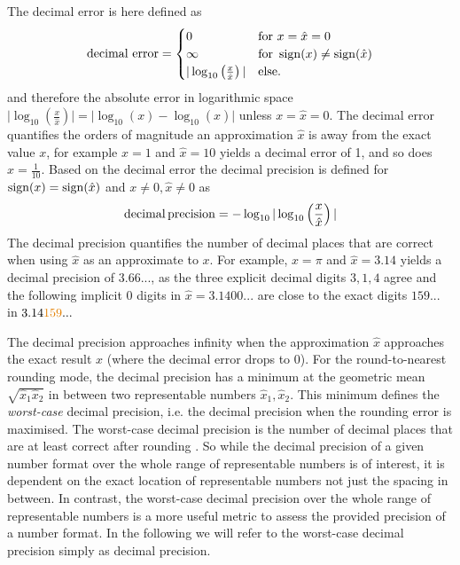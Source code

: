 The decimal error is here defined as
\begin{equation}
	\text{decimal error} = \begin{cases}
						0 &\text{for } x = \hat{x} = 0 \\
						\infty &\text{for } \operatorname{sign}(x) \neq \operatorname{sign}(\hat{x}) \\
						\vert \log_{10}\left( \frac{x}{\hat{x}} \right) \vert &\text{else.}
					\end{cases}
	\label{eq:decerror}
\end{equation}
and therefore the absolute error in logarithmic space
$\vert \log_{10}(\tfrac{x}{\hat{x}}) \vert = \vert \log_{10}(x) - \log_{10}(\hat{x}) \vert$ unless $x = \hat{x} = 0$.
The decimal error quantifies the orders of magnitude an approximation $\hat{x}$ is away from the exact value $x$,
for example $x = 1$ and $\hat{x} = 10$ yields a decimal error of 1, and so does $\hat{x} = \tfrac{1}{10}$. Based on
the decimal error the decimal precision is defined for $\operatorname{sign}(x) = \operatorname{sign}(\hat{x})$ and $x \neq 0, \hat{x} \neq 0$ 
as \citep{Gustafson2017a,Klower2019a}
\begin{equation}
\operatorname{decimal} \operatorname{precision} = -\log_{10} \vert \log_{10} \left( \frac{x}{\hat{x}} \right) \vert
\end{equation}
The decimal precision quantifies the number of decimal places that are correct when using $\hat{x}$ as an approximate
to $x$. For example, $x = \pi$ and $\hat{x} = 3.14$ yields a decimal precision of $3.66...$, as the three explicit decimal
digits $3,1,4$ agree and the following implicit 0 digits in $\hat{x} = 3.1400...$ are close to the exact digits $159...$ in $3.14{\color{pregime}159}...$

The decimal precision approaches infinity when the approximation $\hat{x}$ approaches the exact result $x$ (where the
decimal error drops to 0). For the round-to-nearest rounding mode, the decimal precision has a minimum
at the geometric mean $\sqrt{\hat{x}_1\hat{x}_2}$ in between two representable numbers $\hat{x}_1,\hat{x}_2$. 
This minimum defines the \emph{worst-case} decimal precision, i.e. the decimal precision when the rounding error
is maximised. The worst-case decimal precision is the number of decimal places that are at least correct after rounding
\citep{Gustafson2017a}. So while the decimal precision of a given number format over the whole
range of representable numbers is of interest, it is dependent on the exact location of representable numbers not just
the spacing in between. In contrast, the worst-case decimal precision over the whole range of representable numbers
is a more useful metric to assess the provided precision of a number format. In the following we will refer to the
worst-case decimal precision simply as decimal precision.

